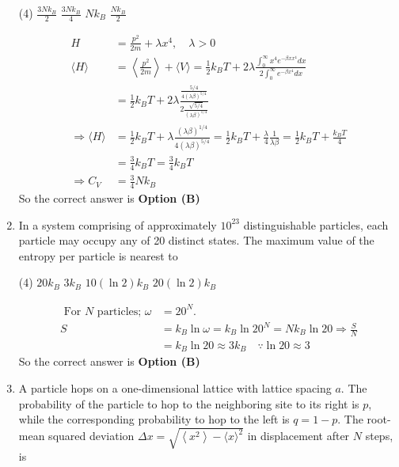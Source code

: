 \begin{enumerate}
{	}
\begin{tasks}(4)
\task[\textbf{A.}] $\frac{3 N k_{B}}{2}$
\task[\textbf{B.}] $\frac{3 N k_{B}}{4}$
\task[\textbf{C.}] $N k_{B}$
\task[\textbf{D.}] $\frac{N k_{B}}{2}$
\end{tasks}
\begin{answer}
\begin{align*}
H&=\frac{p^{2}}{2 m}+\lambda x^{4}, \quad \lambda>0\\
\langle H\rangle&=\left\langle\frac{p^{2}}{2 m}\right\rangle+\langle V\rangle=\frac{1}{2} k_{B} T+2 \lambda \frac{\int_{0}^{\infty} x^{4} e^{-\beta x x^{4}} d x}{2 \int_{0}^{\infty} e^{-\beta x^{4}} d x}\\&=\frac{1}{2} k_{B} T+2 \lambda \frac{\frac{5 / 4}{4(\lambda \beta)^{5 / 4}}}{2 \frac{\sqrt{5 / 4}}{(\lambda \beta)^{1 / 4}}}\\
\Rightarrow\langle H\rangle&=\frac{1}{2} k_{B} T+\lambda \frac{(\lambda \beta)^{1 / 4}}{4(\lambda \beta)^{5 / 4}}=\frac{1}{2} k_{B} T+\frac{\lambda}{4} \frac{1}{\lambda \beta}=\frac{1}{2} k_{B} T+\frac{k_{B} T}{4}\\&=\frac{3}{4} k_{B} T=\frac{3}{4} k_{B} T\\
\Rightarrow C_{V}&=\frac{3}{4} N k_{B}
\end{align*}
So the correct answer is \textbf{Option (B)}
\end{answer}
	\item In a system comprising of approximately $10^{23}$ distinguishable particles, each particle may occupy any of 20 distinct states. The maximum value of the entropy per particle is nearest to
{	}
\begin{tasks}(4)
\task[\textbf{A.}] $20 k_{B}$
\task[\textbf{B.}]  $3 k_{B}$
\task[\textbf{C.}] $10(\ln 2) k_{B}$
\task[\textbf{D.}] $20(\ln 2) k_{B}$
\end{tasks}
\begin{answer}
\begin{align*}
\text{	For $N$ particles; }\omega&=20^{N} .\\
S&=k_{B} \ln \omega=k_{B} \ln 20^{N}=N k_{B} \ln 20 \Rightarrow \frac{S}{N}\\&=k_{B} \ln 20 \approx 3 k_{B} \quad \because \ln 20 \approx 3
\end{align*}
So the correct answer is \textbf{Option (B)}
\end{answer}
	\item A particle hops on a one-dimensional lattice with lattice spacing $a$. The probability of the particle to hop to the neighboring site to its right is $p$, while the corresponding probability to hop to the left is $q=1-p$. The root-mean squared deviation $\Delta x=\sqrt{\left\langle x^{2}\right\rangle-\langle x\rangle^{2}}$ in displacement after $N$ steps, is

\end{enumerate}
